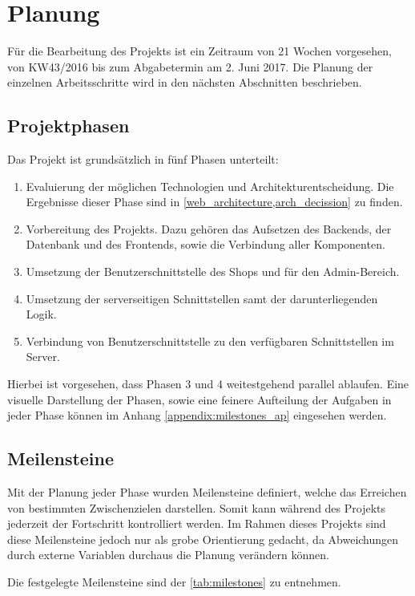 \section{Planung} \thispagestyle{nomarkstyle}
Für die Bearbeitung des Projekts ist ein Zeitraum von 21 Wochen vorgesehen, von KW43/2016 bis zum Abgabetermin am 2. Juni 2017.
Die Planung der einzelnen Arbeitsschritte wird in den nächsten Abschnitten beschrieben.

\subsection{Projektphasen}
Das Projekt ist grundsätzlich in fünf Phasen unterteilt:
\begin{enumerate}
	\item Evaluierung der möglichen Technologien und Architekturentscheidung. Die Ergebnisse dieser Phase sind in \cref{web_architecture,arch_decission} zu finden.
	\item Vorbereitung des Projekts. Dazu gehören das Aufsetzen des Backends, der Datenbank und des Frontends, sowie die Verbindung aller Komponenten.
	\item Umsetzung der Benutzerschnittstelle des Shops und für den Admin-Bereich.
	\item Umsetzung der serverseitigen Schnittstellen samt der darunterliegenden Logik.
	\item Verbindung von Benutzerschnittstelle zu den verfügbaren Schnittstellen im Server.
\end{enumerate}

Hierbei ist vorgesehen, dass Phasen 3 und 4 weitestgehend parallel ablaufen. Eine visuelle Darstellung der Phasen, sowie eine feinere Aufteilung der Aufgaben in jeder Phase können im Anhang \ref{appendix:milestones_ap} eingesehen werden.

\subsection{Meilensteine}
Mit der Planung jeder Phase wurden Meilensteine definiert, welche das Erreichen von bestimmten Zwischenzielen darstellen. Somit kann während des Projekts jederzeit der Fortschritt kontrolliert werden.
Im Rahmen dieses Projekts sind diese Meilensteine jedoch nur als grobe Orientierung gedacht, da Abweichungen durch externe Variablen durchaus die Planung verändern können.

Die festgelegte Meilensteine sind der \cref{tab:milestones} zu entnehmen.

